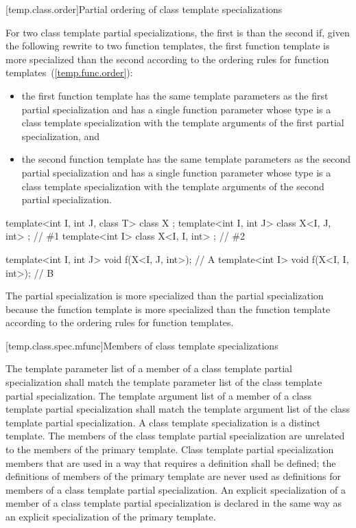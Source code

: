[temp.class.order]{Partial ordering of class template specializations}

\pnum
For two class template partial specializations,
the first is  than the second if, given the following
rewrite to two function templates, the first function template is more
specialized than the second according to the ordering rules for function
templates~(\ref{temp.func.order}):

\begin{itemize}
\item
the first function template has the same template parameters as
the first partial specialization and has a single function parameter
whose type is a class template specialization with the template arguments of
the first partial specialization, and
\item
the second function template has the same template parameters as
the second partial specialization and has a single function parameter
whose type is a class template specialization with the template arguments of
the second partial specialization.
\end{itemize}

\pnum
\enterexample
\begin{codeblock}
template<int I, int J, class T> class X { };
template<int I, int J>          class X<I, J, int> { }; // \#1
template<int I>                 class X<I, I, int> { }; // \#2

template<int I, int J> void f(X<I, J, int>);            // A
template<int I>        void f(X<I, I, int>);            // B
\end{codeblock}

The partial specialization
is more specialized than the partial specialization
because the function template
is more specialized than the function template
according to the ordering rules for function templates.
\exitexample

[temp.class.spec.mfunc]{Members of class template specializations}

\pnum
The template parameter list of a member of a class template partial
specialization shall match the template parameter list of the class template
partial specialization.
The template argument list of a member of a class template partial
specialization shall match the template argument list of the class template
partial specialization.
A class template specialization is a distinct template.
The members of the class template partial specialization are
unrelated to the members of the primary template.
Class template partial specialization members that are used in a way that
requires a definition shall be defined; the definitions of members of the
primary template are never used as definitions for members of a class
template partial specialization.
An explicit specialization of a member of a class template partial
specialization is declared in the same way as an explicit specialization of
the primary template.
\enterexample


